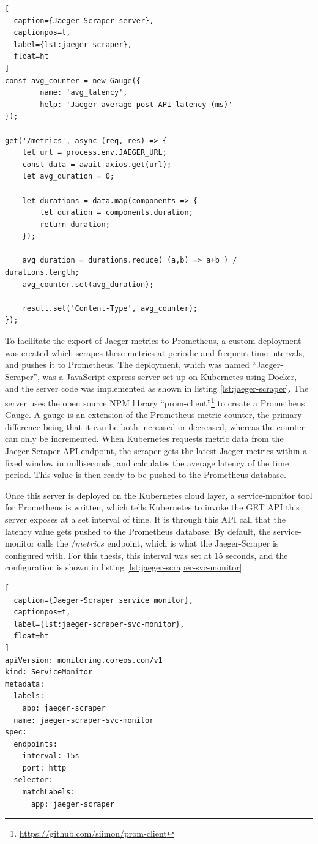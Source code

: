 \begin{lstlisting}[
  caption={Jaeger-Scraper server},
  captionpos=t,
  label={lst:jaeger-scraper},
  float=ht
]
const avg_counter = new Gauge({
        name: 'avg_latency',
        help: 'Jaeger average post API latency (ms)'
});

get('/metrics', async (req, res) => {
    let url = process.env.JAEGER_URL;
    const data = await axios.get(url);
    let avg_duration = 0;

    let durations = data.map(components => {
        let duration = components.duration;
        return duration;
    });

    avg_duration = durations.reduce( (a,b) => a+b ) / durations.length;
    avg_counter.set(avg_duration);

    result.set('Content-Type', avg_counter);
});
\end{lstlisting}

To facilitate the export of Jaeger metrics to Prometheus, a custom deployment was created which scrapes these metrics at periodic and frequent time intervals, and pushes it to Prometheus. The deployment, which was named ``Jaeger-Scraper'', was a JavaScript express server set up on Kubernetes using Docker, and the server code was implemented as shown in listing \ref{lst:jaeger-scraper}. The server uses the open source NPM library ``prom-client''\footnote{\url{https://github.com/siimon/prom-client}} to create a Prometheus Gauge. A gauge is an extension of the Prometheus metric counter, the primary difference being that it can be both increased or decreased, whereas the counter can only be incremented. When Kubernetes requests metric data from the Jaeger-Scraper API endpoint, the scraper gets the latest Jaeger metrics within a fixed window in milliseconds, and calculates the average latency of the time period. This value is then ready to be pushed to the Prometheus database.

Once this server is deployed on the Kubernetes cloud layer, a service-monitor tool for Prometheus is written, which tells Kubernetes to invoke the GET API this server exposes at a set interval of time. It is through this API call that the latency value gets pushed to the Prometheus database. By default, the service-monitor calls the $/metrics$ endpoint, which is what the Jaeger-Scraper is configured with. For this thesis, this interval was set at 15 seconds, and the configuration is shown in listing \ref{lst:jaeger-scraper-svc-monitor}.

\begin{lstlisting}[
  caption={Jaeger-Scraper service monitor},
  captionpos=t,
  label={lst:jaeger-scraper-svc-monitor},
  float=ht
]
apiVersion: monitoring.coreos.com/v1
kind: ServiceMonitor
metadata:
  labels:
    app: jaeger-scraper
  name: jaeger-scraper-svc-monitor
spec:
  endpoints:
  - interval: 15s
    port: http
  selector:
    matchLabels:
      app: jaeger-scraper
\end{lstlisting}


